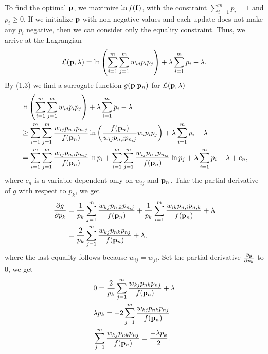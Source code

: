 \documentclass{scrartcl}
\begin{document}
To find the optimal $\mathbf{p}$, we maximize $\ln f(\mathbf{f})$, with the constraint
$\sum_{i=1}^m p_i = 1$ and $p_i \ge 0$. If we initialize $\mathbf{p}$
with non-negative values and each update does not make any $p_i$
negative, then we can consider only the equality constraint.
Thus, we arrive at the Lagrangian 
\begin{equation}
	\mathcal{L}(\mathbf{p}, \lambda)
	= \ln \left(\sum_{i=1}^m \sum_{j=1}^m w_{ij}p_ip_j \right)
	+ \lambda \sum_{i=1}^m p_i - \lambda .
\end{equation}
By (1.3) we find a surrogate function $g(\mathbf{p}|\mathbf{p}_n)$ for $\mathcal{L}(\mathbf{p}, \lambda)$
\begin{align}
	\begin{split}
	& \ln \left(\sum_{i=1}^m \sum_{j=1}^m w_{ij}p_ip_j \right)
	  + \lambda \sum_{i=1}^m p_i - \lambda \\
	& \ge \sum_{i=1}^m\sum_{j=1}^m {
			{ {w_{ij}p_{n,i}p_{n,j}} \over f(\mathbf{p}_n) }
			\ln \left({ f(\mathbf{p}_n) \over {w_{ij}p_{n,i}p_{n,j}} } w_i p_i p_j \right)}
		   + \lambda \sum_{i=1}^m p_i - \lambda \\
	& = \sum_{i=1}^m\sum_{j=1}^m {
			{ {w_{ij}p_{n,i}p_{n,j}} \over f(\mathbf{p}_n) } \ln p_i}
		+ \sum_{i=1}^m\sum_{j=1}^m {
			{ {w_{ij}p_{n,i}p_{n,j}} \over f(\mathbf{p}_n) } \ln p_j}
		   + \lambda \sum_{i=1}^m p_i - \lambda + c_n ,
	\end{split}
\end{align}
where $c_n$ is a variable dependent only on $w_{ij}$ and $\mathbf{p}_n$.
Take the partial derivative of $g$ with
respect to $p_k$, we get
\begin{align}
	\begin{split}
	{\partial g \over \partial p_k}
	& = {1 \over p_k} \sum_{j=1}^m { {w_{kj}p_{n,k}p_{n,j}} \over f(\mathbf{p}_n) }
	+ {1 \over p_k} \sum_{i=1}^m { {w_{ik}p_{n,i}p_{n,k}} \over f(\mathbf{p}_n) }
	+ \lambda \\
	& = {2 \over p_k} \sum_{j=1}^m { {w_{kj}p_{nk}p_{nj}} \over f(\mathbf{p}_n) }
	+ \lambda ,
	\end{split}
\end{align}
where the last equality follows because $w_{ij} = w_{ji}$.
Set the partial derivative
${\partial g \over \partial p_k}$ to 0, we get
\begin{align}
	\begin{split}
	& 0 = {2 \over p_k} \sum_{j=1}^m { {w_{kj}p_{nk}p_{nj}} \over f(\mathbf{p}_n) }+\lambda \\
	& \lambda p_k = -2 \sum_{j=1}^m { {w_{kj}p_{nk}p_{nj}} \over f(\mathbf{p}_n) } \\
	& \sum_{j=1}^m { {w_{kj}p_{nk}p_{nj}} \over f(\mathbf{p}_n) } = { -\lambda p_k \over 2} .
	\end{split}
	\label{eqn:par_zero}
\end{align}
\end{document}
